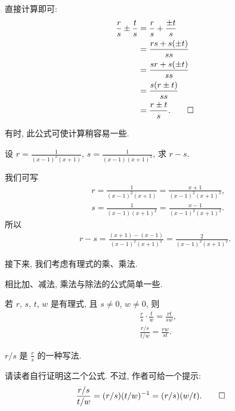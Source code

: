\begin{pf}
    直接计算即可:
    \begin{align*}
        \frac{r}{s} \pm \frac{t}{s}
        = {} & \frac{r}{s} + \frac{\pm t}{s} \\
        = {} & \frac{rs + s(\pm t)}{ss}      \\
        = {} & \frac{sr + s(\pm t)}{ss}      \\
        = {} & \frac{s(r \pm t)}{ss}         \\
        = {} & \frac{r \pm t}{s}. \qedhere
    \end{align*}
\end{pf}

\begin{remark}
    有时, 此公式可使计算稍容易一些.
\end{remark}

\begin{example}
    设 $r = \frac{1}{(x-1)^2 (x+1)}$, $s = \frac{1}{(x-1) (x+1)^2}$, 求 $r - s$.

    我们可写
    \begin{align*}
         & r = \frac{1}{(x-1)^2 (x+1)} = \frac{x+1}{(x-1)^2 (x+1)^2}, \\
         & s = \frac{1}{(x-1) (x+1)^2} = \frac{x-1}{(x-1)^2 (x+1)^2}.
    \end{align*}
    所以
    \begin{align*}
        r - s = \frac{(x+1) - (x-1)}{(x-1)^2 (x+1)^2} = \frac{2}{(x-1)^2 (x+1)^2}.
    \end{align*}
\end{example}

接下来, 我们考虑有理式的乘、乘法.

相比加、减法, 乘法与除法的公式简单一些.

\begin{proposition}
    若 $r$, $s$, $t$, $w$ 是有理式, 且 $s \neq 0$, $w \neq 0$, 则
    \begin{align*}
         & \frac{r}{s} \cdot \frac{t}{w} = \frac{rt}{sw}, \\
         & \frac{r/s}{t/w} = \frac{rw}{st}.
    \end{align*}
\end{proposition}

\begin{remark}
    $r/s$ 是 $\frac{r}{s}$ 的一种写法.
\end{remark}

\begin{pf}
    请读者自行证明这二个公式. 不过, 作者可给一个提示:
    \begin{align*}
         & \frac{r/s}{t/w} = (r/s) (t/w)^{-1} = (r/s) (w/t). \qedhere
    \end{align*}
\end{pf}

